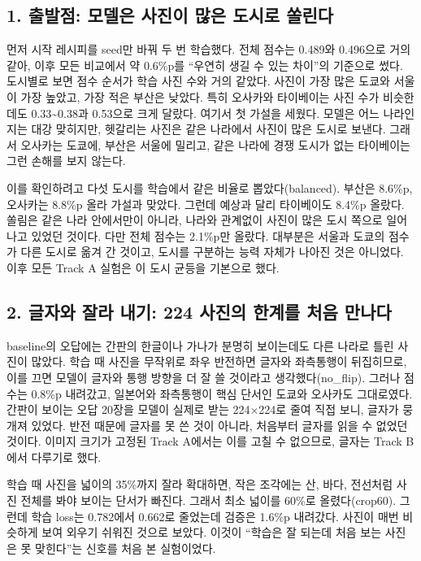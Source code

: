 \documentclass[11pt]{article}
\begin{document}
\subsection*{1. 출발점: 모델은 사진이 많은 도시로 쏠린다}

먼저 시작 레시피를 seed만 바꿔 두 번 학습했다. 전체 점수는 0.489와 0.496으로 거의 같아, 이후 모든 비교에서 약 0.6\%p를 ``우연히 생길 수 있는 차이''의 기준으로 썼다. 도시별로 보면 점수 순서가 학습 사진 수와 거의 같았다. 사진이 가장 많은 도쿄와 서울이 가장 높았고, 가장 적은 부산은 낮았다. 특히 오사카와 타이베이는 사진 수가 비슷한데도 0.33\textasciitilde 0.38과 0.53으로 크게 달랐다. 여기서 첫 가설을 세웠다. 모델은 어느 나라인지는 대강 맞히지만, 헷갈리는 사진은 같은 나라에서 사진이 많은 도시로 보낸다. 그래서 오사카는 도쿄에, 부산은 서울에 밀리고, 같은 나라에 경쟁 도시가 없는 타이베이는 그런 손해를 보지 않는다.

이를 확인하려고 다섯 도시를 학습에서 같은 비율로 뽑았다(balanced). 부산은 8.6\%p, 오사카는 8.8\%p 올라 가설과 맞았다. 그런데 예상과 달리 타이베이도 8.4\%p 올랐다. 쏠림은 같은 나라 안에서만이 아니라, 나라와 관계없이 사진이 많은 도시 쪽으로 일어나고 있었던 것이다. 다만 전체 점수는 2.1\%p만 올랐다. 대부분은 서울과 도쿄의 점수가 다른 도시로 옮겨 간 것이고, 도시를 구분하는 능력 자체가 나아진 것은 아니었다. 이후 모든 Track A 실험은 이 도시 균등을 기본으로 했다.

\subsection*{2. 글자와 잘라 내기: 224 사진의 한계를 처음 만나다}

baseline의 오답에는 간판의 한글이나 가나가 분명히 보이는데도 다른 나라로 틀린 사진이 많았다. 학습 때 사진을 무작위로 좌우 반전하면 글자와 좌측통행이 뒤집히므로, 이를 끄면 모델이 글자와 통행 방향을 더 잘 쓸 것이라고 생각했다(no\_flip). 그러나 점수는 0.8\%p 내려갔고, 일본어와 좌측통행이 핵심 단서인 도쿄와 오사카도 그대로였다. 간판이 보이는 오답 20장을 모델이 실제로 받는 224×224로 줄여 직접 보니, 글자가 뭉개져 있었다. 반전 때문에 글자를 못 쓴 것이 아니라, 처음부터 글자를 읽을 수 없었던 것이다. 이미지 크기가 고정된 Track A에서는 이를 고칠 수 없으므로, 글자는 Track B에서 다루기로 했다.

학습 때 사진을 넓이의 35\%까지 잘라 확대하면, 작은 조각에는 산, 바다, 전선처럼 사진 전체를 봐야 보이는 단서가 빠진다. 그래서 최소 넓이를 60\%로 올렸다(crop60). 그런데 학습 loss는 0.782에서 0.662로 줄었는데 검증은 1.6\%p 내려갔다. 사진이 매번 비슷하게 보여 외우기 쉬워진 것으로 보았다. 이것이 ``학습은 잘 되는데 처음 보는 사진은 못 맞힌다''는 신호를 처음 본 실험이었다.
\end{document}
